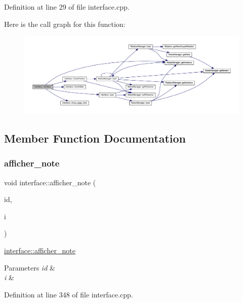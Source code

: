 Definition at line 29 of file interface.\+cpp.

Here is the call graph for this function\+:\nopagebreak
\begin{figure}[H]
\begin{center}
\leavevmode
\includegraphics[width=350pt]{classinterface_a13e0ee4b9df1714d747d62ec46220c55_cgraph}
\end{center}
\end{figure}


\subsection{Member Function Documentation}
\mbox{\label{classinterface_a320051a7a36aa24f53b12df82649f15f}} 
\subsubsection{\texorpdfstring{afficher\+\_\+note}{afficher\_note}}
{\footnotesize\ttfamily void interface\+::afficher\+\_\+note (\begin{DoxyParamCaption}\item[{Q\+String}]{id,  }\item[{int}]{i }\end{DoxyParamCaption})\hspace{0.3cm}{\ttfamily [slot]}}



\hyperlink{classinterface_a320051a7a36aa24f53b12df82649f15f}{interface\+::afficher\+\_\+note} 


\begin{DoxyParams}{Parameters}
{\em id} & \\
\hline
{\em i} & \\
\hline
\end{DoxyParams}


Definition at line 348 of file interface.\+cpp.

